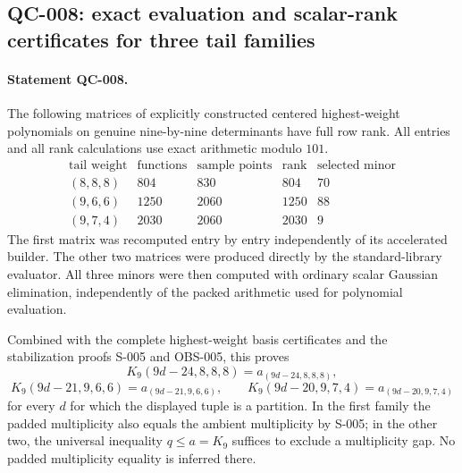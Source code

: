 \subsection{QC-008: exact evaluation and scalar-rank certificates for three tail families}

\paragraph{Statement QC-008.}
The following matrices of explicitly constructed centered highest-weight
polynomials on genuine nine-by-nine determinants have full row rank.
All entries and all rank calculations use exact arithmetic modulo $101$.
\[
\begin{array}{c|r|r|r|r}
\text{tail weight}&\text{functions}&\text{sample points}&
 \text{rank}&\text{selected minor}\\\hline
(8,8,8)&804&830&804&70\\
(9,6,6)&1250&2060&1250&88\\
(9,7,4)&2030&2060&2030&9
\end{array}
\tag{QC-008.1}
\]
The first matrix was recomputed entry by entry independently of its
accelerated builder. The other two matrices were produced directly by
the standard-library evaluator. All three minors were then computed
with ordinary scalar Gaussian elimination, independently of the packed
arithmetic used for polynomial evaluation.

Combined with the complete highest-weight basis certificates and the
stabilization proofs S-005 and OBS-005, this proves
\[
 K_9(9d-24,8,8,8)=a_{(9d-24,8,8,8)},
\]
\[
 K_9(9d-21,9,6,6)=a_{(9d-21,9,6,6)},\qquad
 K_9(9d-20,9,7,4)=a_{(9d-20,9,7,4)}
\tag{QC-008.2}
\]
for every $d$ for which the displayed tuple is a partition.
In the first family the padded multiplicity also equals the ambient
multiplicity by S-005; in the other two, the universal inequality
$q\leq a=K_9$ suffices to exclude a multiplicity gap. No padded
multiplicity equality is inferred there.

